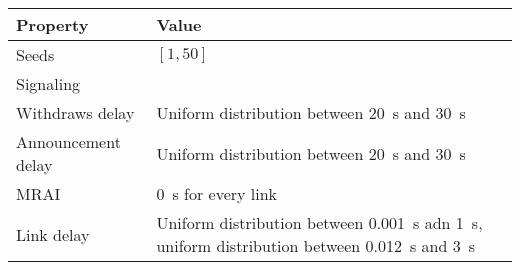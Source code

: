 \begin{center}
	\begin{tabular}{ || m{4cm}| m{8cm} || } 
	\hline
	Property & Value \\ 
	\hline \hline
	Seeds & $[1, 50]$ \\ 
	\hline
	Signaling & \q{AW} \\
	\hline
	Withdraws delay & Uniform distribution between \SI{20}{\second} and \SI{30}{\second} \\ 
	\hline
	Announcement delay & Uniform distribution between \SI{20}{\second} and \SI{30}{\second} \\ 
	\hline
	MRAI & \SI{0}{\second} for every link \\
	\hline
	Link delay & Uniform distribution between \SI{0.001}{\second} adn \SI{1}{\second}, uniform distribution between \SI{0.012}{\second} and \SI{3}{\second} \\
	\hline
	\end{tabular}
\end{center}
